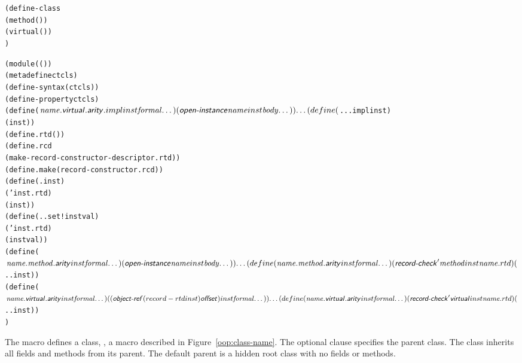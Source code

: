 \begin{syntax}\begin{alltt}
(define-class 
  (method (  \etc)  \etc) \etc
  (virtual (  \etc)  \etc) \etc
  )\strut\end{alltt}
\end{syntax}
\expandsto{}\begin{alltt}\antipar
(module ((  \etc))
  (meta define ctcls )
  (define-syntax  ( ctcls))
  (define-property   ctcls)
  (define ($\var{name}.\nl{virtual}.\nl{arity}.impl inst \var{formal} \etc)
    (\nl{open-instance} \var{name} inst \var{body} \etc)) \etc
  (define ($...impl inst  \etc)
    (  inst  \etc)) \etc
  (define .rtd ( ))
  (define .rcd
    (make-record-constructor-descriptor .rtd  ))
  (define .make (record-constructor .rcd))
  (define (. inst)
    ( ' inst .rtd)
    ( inst )) \etc
  (define (..set! inst val)
    ( ' inst .rtd)
    ( inst  val)) \etc
  (define ($\var{name}.\var{method}.\nl{arity} inst \var{formal} \etc)
    (\nl{open-instance} \var{name} inst \var{body} \etc)) \etc
  (define (\var{name}.\var{method}.\nl{arity} inst \var{formal} \etc)
    (\nl{record-check} '\var{method} inst \var{name}.rtd)
    ($.. inst  \etc)) \etc
  (define ($\var{name}.\nl{virtual}.\nl{arity} inst \var{formal} \etc)
    ((\nl{object-ref} (record-rtd inst) \nl{offset}) inst \var{formal} \etc)) \etc
  (define (\var{name}.\nl{virtual}.\nl{arity} inst \var{formal} \etc)
    (\nl{record-check} '\nl{virtual} inst \var{name}.rtd)
    ($.. inst  \etc)) \etc
  )\end{alltt}

The  macro defines a class, , a macro described in
Figure~\ref{oop:class-name}. The optional  clause specifies the parent
class. The class inherits all fields and methods from its parent. The default parent is a
hidden root class with no fields or methods.

